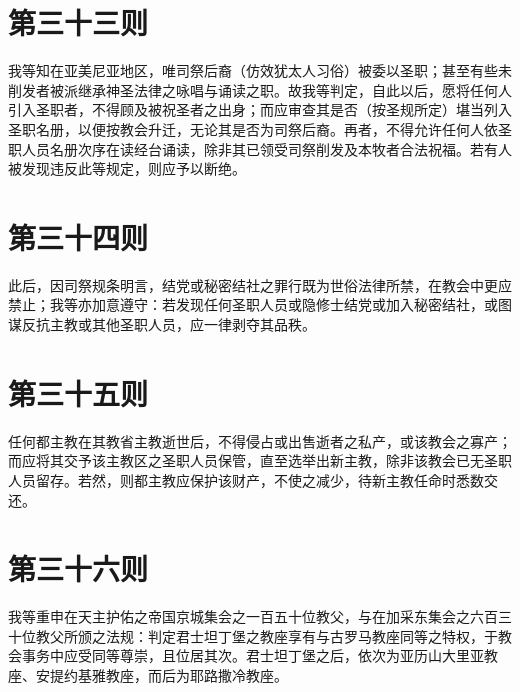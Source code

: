 
\section{第三十三则}

我等知在亚美尼亚地区，唯司祭后裔（仿效犹太人习俗）被委以圣职；甚至有些未削发者被派继承神圣法律之咏唱与诵读之职。故我等判定，自此以后，愿将任何人引入圣职者，不得顾及被祝圣者之出身；而应审查其是否（按圣规所定）堪当列入圣职名册，以便按教会升迁，无论其是否为司祭后裔。再者，不得允许任何人依圣职人员名册次序在读经台诵读，除非其已领受司祭削发及本牧者合法祝福。若有人被发现违反此等规定，则应予以断绝。\par


\section{第三十四则}

此后，因司祭规条明言，结党或秘密结社之罪行既为世俗法律所禁，在教会中更应禁止；我等亦加意遵守：若发现任何圣职人员或隐修士结党或加入秘密结社，或图谋反抗主教或其他圣职人员，应一律剥夺其品秩。\par


\section{第三十五则}

任何都主教在其教省主教逝世后，不得侵占或出售逝者之私产，或该教会之寡产；而应将其交予该主教区之圣职人员保管，直至选举出新主教，除非该教会已无圣职人员留存。若然，则都主教应保护该财产，不使之减少，待新主教任命时悉数交还。\par


\section{第三十六则}

我等重申在天主护佑之帝国京城集会之一百五十位教父，与在加采东集会之六百三十位教父所颁之法规：判定君士坦丁堡之教座享有与古罗马教座同等之特权，于教会事务中应受同等尊崇，且位居其次。君士坦丁堡之后，依次为亚历山大里亚教座、安提约基雅教座，而后为耶路撒冷教座。\par

